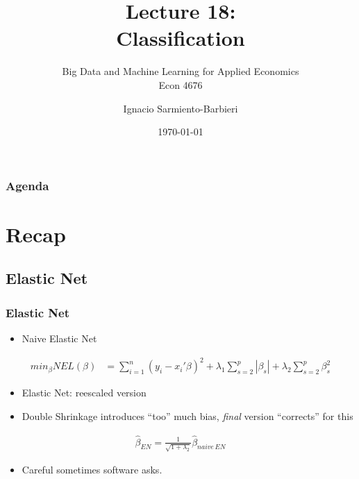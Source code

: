 \documentclass[
  shownotes,
  xcolor={svgnames},
  hyperref={colorlinks,citecolor=DarkBlue,linkcolor=DarkRed,urlcolor=DarkBlue}
  , aspectratio=169]{beamer}
\begin{document}
 
\title[Lecture 18]{Lecture 18: \\ Classification}
\subtitle{Big Data and Machine Learning for Applied Economics \\ Econ 4676}
\date{\today}

\author[Sarmiento-Barbieri]{Ignacio Sarmiento-Barbieri}


\begin{frame}[noframenumbering]
\maketitle
\end{frame}





\begin{frame}
\frametitle{Agenda}

\tableofcontents

\end{frame}

\section{Recap }
\subsection{Elastic Net}
\begin{frame}[fragile]
\frametitle{Elastic Net}

\begin{itemize}
\item Naive Elastic Net
\end{itemize}

\begin{align}
min_{\beta} NEL(\beta) &= \sum_{i=1}^n (y_i-x_i'\beta)^2 + \lambda_1 \sum_{s=2}^p |\beta_s| + \lambda_2 \sum_{s=2}^p \beta_s^2 
\end{align}

\begin{itemize}
\item Elastic Net: reescaled version
\item Double Shrinkage introduces ``too'' much bias, {\it final} version ``corrects'' for this
\end{itemize}
\bigskip
\begin{align}
\hat{\beta}_{EN}= \frac{1}{\sqrt{1+\lambda_2}}\hat{\beta}_{naive\,EN}
\end{align}
\bigskip
\begin{itemize}
  \item Careful sometimes software asks.
\end{itemize}



\end{frame}
\end{document}
